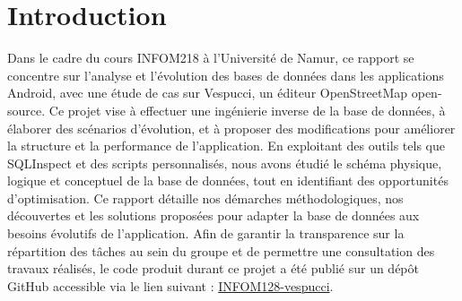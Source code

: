 \section{Introduction}
Dans le cadre du cours INFOM218 à l'Université de Namur, ce rapport se concentre sur l'analyse et l'évolution des bases de données dans les applications Android, avec une étude de cas sur Vespucci, un éditeur OpenStreetMap open-source. Ce projet vise à effectuer une ingénierie inverse de la base de données, à élaborer des scénarios d'évolution, et à proposer des modifications pour améliorer la structure et la performance de l'application. En exploitant des outils tels que SQLInspect et des scripts personnalisés, nous avons étudié le schéma physique, logique et conceptuel de la base de données, tout en identifiant des opportunités d'optimisation. Ce rapport détaille nos démarches méthodologiques, nos découvertes et les solutions proposées pour adapter la base de données aux besoins évolutifs de l'application.
Afin de garantir la transparence sur la répartition des tâches au sein du groupe et de permettre une consultation des travaux réalisés, le code produit durant ce projet a été publié sur un dépôt GitHub accessible via le lien suivant : \href{https://github.com/ThibBer/INFOM128-vespucci}{INFOM128-vespucci}.